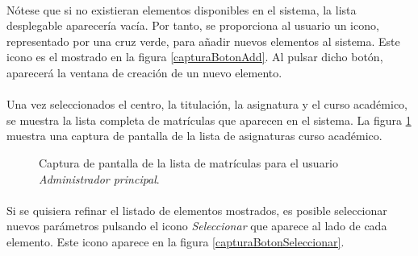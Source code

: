   \paragraph{}Nótese que si no existieran elementos disponibles en el sistema,
  la lista desplegable aparecería vacía. Por tanto, se proporciona al usuario
  un icono, representado por una cruz verde, para añadir nuevos elementos al
  sistema. Este icono es el mostrado en la figura \ref{capturaBotonAdd}. Al
  pulsar dicho botón, aparecerá la ventana de creación de un nuevo elemento.

  \paragraph{}Una vez seleccionados el centro, la titulación, la asignatura y
  el curso académico, se muestra la lista completa de matrículas que aparecen en
  el sistema. La figura \ref{capturaPantallaListaMatriculasAdminPrincipal}
  muestra una captura de pantalla de la lista de asignaturas curso académico.

  \begin{figure}[!ht]
    \begin{center}
      \caption{Captura de pantalla de la lista de matrículas para el usuario \textit{Administrador principal}.}
      \label{capturaPantallaListaMatriculasAdminPrincipal}
    \end{center}
  \end{figure}

  \paragraph{}Si se quisiera refinar el listado de elementos mostrados, es
  posible seleccionar nuevos parámetros pulsando el icono \textit{Seleccionar}
  que aparece al lado de cada elemento. Este icono aparece en la figura
  \ref{capturaBotonSeleccionar}.

